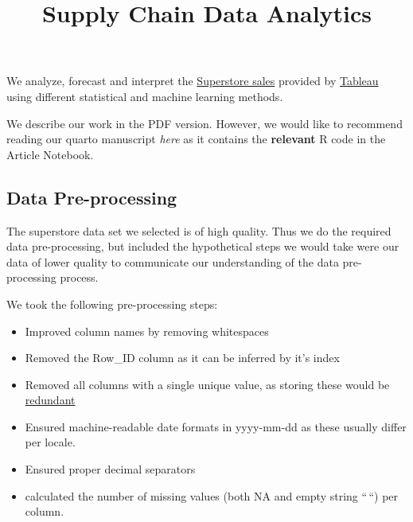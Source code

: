 \documentclass[
]{agujournal2019}
\providecommand{\tightlist}{%
  \setlength{\itemsep}{0pt}\setlength{\parskip}{0pt}}\usepackage{longtable,booktabs,array}
\begin{document}
\title{Supply Chain Data Analytics}








We analyze, forecast and interpret the
\href{https://public.tableau.com/app/sample-data/sample_-_superstore.xls}{Superstore
sales} provided by
\href{https://public.tableau.com/app/learn/sample-data}{Tableau} using
different statistical and machine learning methods.

We describe our work in the PDF version. However, we would like to
recommend reading our quarto manuscript \emph{here} as it contains the
\textbf{relevant} R code in the Article Notebook.

\subsection{Data Pre-processing}\label{data-pre-processing}

The superstore data set we selected is of high quality. Thus we do the
required data pre-processing, but included the hypothetical steps we
would take were our data of lower quality to communicate our
understanding of the data pre-processing process.

We took the following pre-processing steps:

\begin{itemize}
\tightlist
\item
  Improved column names by removing whitespaces
\item
  Removed the Row\_ID column as it can be inferred by it's index
\item
  Removed all columns with a single unique value, as storing these would
  be
  \href{https://few.vu.nl/~molenaar/courses/StatR/chapters/B-06-raw_data.html}{redundant}
\item
  Ensured machine-readable date formats in yyyy-mm-dd as these usually
  differ per locale.
\item
  Ensured proper decimal separators
\item
  calculated the number of missing values (both NA and empty string
  ``\,``) per column.
\end{itemize}
\end{document}
